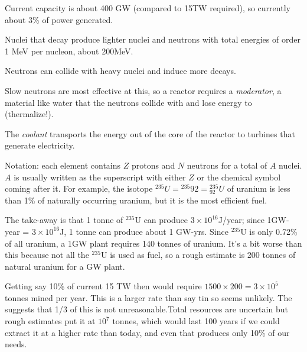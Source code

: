 \documentclass[11pt]{book}
\begin{document}
\bei
\item Current capacity is about 400 GW (compared to 15TW required), so currently about 3\% of power generated.
\item Nuclei that decay produce lighter nuclei and neutrons with total energies of order 1 MeV per nucleon, about 200MeV. 
\item Neutrons can collide with heavy nuclei and induce more decays. 
\item Slow neutrons are most effective at this, so a reactor requires a {\it moderator}, a material like water that the neutrons collide with and lose energy to (thermalize!). 
\item The {\it coolant} transports the energy out of the core of the reactor to turbines that generate electricity.
\eei

Notation: each element contains $Z$ protons and $N$ neutrons for a total of $A$ nuclei. $A$ is usually written as the superscript with either $Z$ or the chemical symbol coming after it. For example, the isotope $^{235}U= {}^{235}{92} = {}^{235}_{92}U$ of uranium is less than 1\% of naturally occurring uranium, but it is the most efficient fuel. 

\bee
\item The take-away is that 1 tonne of $^{235}$U can produce $3\times 10^{16}$J/year; since 1GW-year = $3\times 10^{16}$J, 1 tonne can produce about 1 GW-yrs. Since $^{235}$U is only 0.72\% of all uranium, a 1GW plant requires 140 tonnes of uranium. It's a bit worse than this because not all the $^{235}$U is used as fuel, so a rough estimate is 200 tonnes of natural uranium for a GW plant.
\item Getting say 10\% of current 15 TW then would require $1500\times 200=3\times 10^5$ tonnes mined per year. This is a larger rate than say tin so seems unlikely. The suggests that 1/3 of this is not unreasonable.Total resources are uncertain but rough estimates put it at $10^7$ tonnes, which  would last 100 years if we could extract it at a higher rate than today, and even that produces only 10\% of our needs.
\eee
\end{document}
